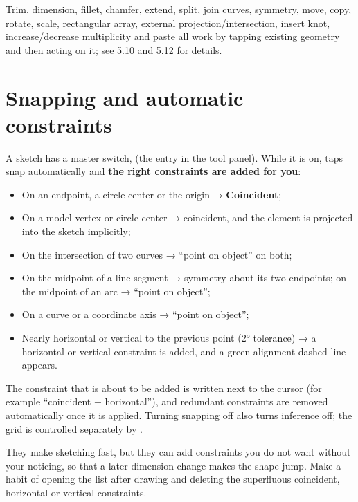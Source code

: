 Trim, dimension, fillet, chamfer, extend, split, join curves, symmetry, move, copy, rotate, scale, rectangular array,
external projection/intersection, insert knot, increase/decrease multiplicity and paste all work by tapping existing
geometry and then acting on it; see 5.10 and 5.12 for details.

\section{Snapping and automatic constraints}

A sketch has a master switch,  (the  entry in the tool panel). While it
is on, taps snap automatically and \textbf{the right constraints are added for you}:

\begin{itemize}
  \item On an endpoint, a circle center or the origin → \textbf{Coincident};
  \item On a model vertex or circle center → coincident, and the element is projected into the sketch implicitly;
  \item On the intersection of two curves → ``point on object'' on both;
  \item On the midpoint of a line segment → symmetry about its two endpoints; on the midpoint of an arc → ``point on object'';
  \item On a curve or a coordinate axis → ``point on object'';
  \item Nearly horizontal or vertical to the previous point (2° tolerance) → a horizontal or vertical constraint is added,
        and a green alignment dashed line appears.
\end{itemize}

The constraint that is about to be added is written next to the cursor (for example ``coincident + horizontal''), and
redundant constraints are removed automatically once it is applied. Turning snapping off also turns inference off; the
grid is controlled separately by .

\begin{tip}
They make sketching fast, but they can add constraints you do not want without your noticing, so that a later dimension
change makes the shape jump. Make a habit of opening the  list after drawing and deleting the
superfluous coincident, horizontal or vertical constraints.
\end{tip}

